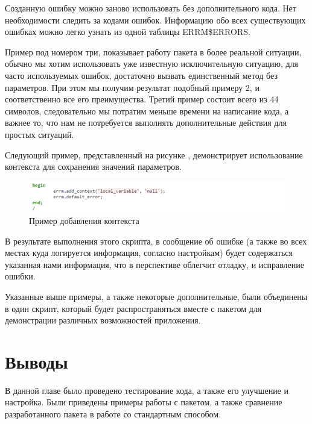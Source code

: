 Созданную ошибку можно заново использовать без дополнительного кода. Нет необходимости следить за кодами ошибок. Информацию обо всех существующих ошибках можно легко узнать из одной таблицы ERRM\$ERRORS. 

Пример под номером три, показывает работу пакета в более реальной ситуации, обычно мы хотим использовать уже известную исключительную ситуацию, для часто используемых ошибок, достаточно вызвать единственный метод без параметров. При этом мы получим результат подобный примеру 2, и соответственно все его преимущества. Третий пример состоит всего из 44 символов, следовательно мы потратим меньше времени на написание кода, а важнее то, что нам не потребуется выполнять дополнительные действия для простых ситуаций. 

Следующий пример, представленный на рисунке , демонстрирует использование контекста для сохранения значений параметров.

\begin{figure}[ht!] 
	\center
	\includegraphics [scale=1] {my_folder/img/c4_add_context_example.png}
	\caption{Пример добавления контекста} 
	\label{fig:c4_add_context_example}  
\end{figure}
\FloatBarrier

В результате выполнения этого скрипта, в сообщение об ошибке (а также во всех местах куда логируется информация, согласно настройкам) будет содержаться указанная нами информация, что в перспективе облегчит отладку, и исправление ошибки. 

Указанные выше примеры, а также некоторые дополнительные, были объединены в один скрипт, который будет распространяться вместе с пакетом для демонстрации различных возможностей приложения.



\section{Выводы} \label{ch4:conclusion}

В данной главе было проведено тестирование кода, а также его улучшение и настройка. Были приведены примеры работы с пакетом, а также сравнение разработанного пакета в работе со стандартным способом. 

